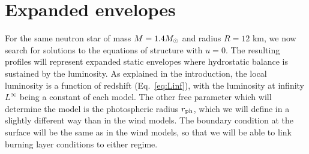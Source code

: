 \documentclass[../main.tex]{subfiles}
\begin{document}
\chapter{Expanded envelopes}\label{chapter4}
For the same neutron star of mass $M=1.4 M_\odot$ and radius $R=12$ km, we now search for solutions to the equations of structure with $u=0$. The resulting profiles will represent expanded static envelopes where hydrostatic balance is sustained by the luminosity. As explained in the introduction, the local luminosity is a function of redshift (Eq.~\ref{eq:Linf}), with the luminosity at infinity $L
^\infty$ being a constant of each model.  The other free parameter which will determine the model is the photospheric radius $r_\text{ph}$, which we will define in a slightly different way than in the wind models. The boundary condition at the surface will be the same as in the wind models, so that we will be able to link burning layer conditions to either regime. 
\end{document}
